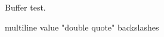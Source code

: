 \documentclass{article}
\begin{document}
Buffer test.



\pydatawritedictopen
{}
\begin{pydatabuffermlvalue}
multiline
value
"double quote"
backslashes \ \ \\
\end{pydatabuffermlvalue}
\pydatawritebuffer
{}
\edef\hash{\pydatabuffermdfivesum}
\expandafter\pydatawritevalue\expandafter{\hash}
\pydatawritedictclose

\end{document}

